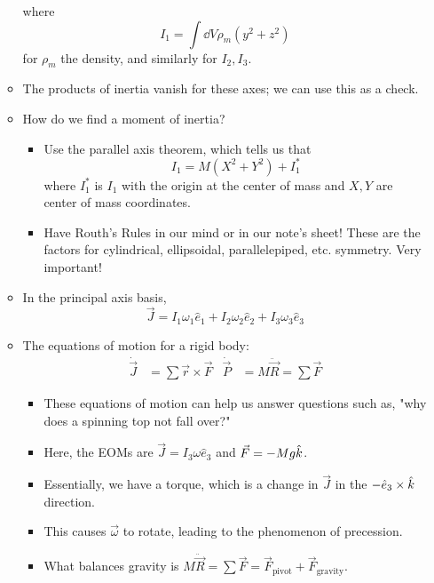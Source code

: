 \documentclass[../notes.tex]{subfiles}
\begin{document}
\begin{itemize}
\begin{itemize}
        where
        \begin{equation*}
            I_1 = \int\dd{V}\rho_m(y^2+z^2)
        \end{equation*}
        for $\rho_m$ the density, and similarly for $I_2,I_3$.
        \item The products of inertia vanish for these axes; we can use this as a check.
        \item How do we find a moment of inertia?
        \begin{itemize}
            \item Use the parallel axis theorem, which tells us that
            \begin{equation*}
                I_1 = M(X^2+Y^2)+I_1^*
            \end{equation*}
            where $I_1^*$ is $I_1$ with the origin at the center of mass and $X,Y$ are center of mass coordinates.
            \item Have Routh's Rules in our mind or in our note's sheet! These are the factors for cylindrical, ellipsoidal, parallelepiped, etc. symmetry. Very important!
        \end{itemize}
        \item In the principal axis basis,
        \begin{equation*}
            \vec{J} = I_1\omega_1\hat{e}_1+I_2\omega_2\hat{e}_2+I_3\omega_3\hat{e}_3
        \end{equation*}
        \item The equations of motion for a rigid body:
        \begin{align*}
            \dot{\vec{J}} &= \sum\vec{r}\times\vec{F}&
            \dot{\vec{P}} &= M\ddot{\vec{R}} = \sum\vec{F}
        \end{align*}
        \begin{itemize}
            \item These equations of motion can help us answer questions such as, "why does a spinning top not fall over?"
            \item Here, the EOMs are $\vec{J}=I_3\omega\hat{e}_3$ and $\vec{F}=-Mg\hat{k}$.
            \item Essentially, we have a torque, which is a change in $\vec{J}$ in the $-\hat{e}_3\times\hat{k}$ direction.
            \item This causes $\vec{\omega}$ to rotate, leading to the phenomenon of precession.
            \item What balances gravity is $M\ddot{\vec{R}}=\sum\vec{F}=\vec{F}_\text{pivot}+\vec{F}_\text{gravity}$.

\end{itemize}
\end{itemize}
\end{itemize}
\end{document}
